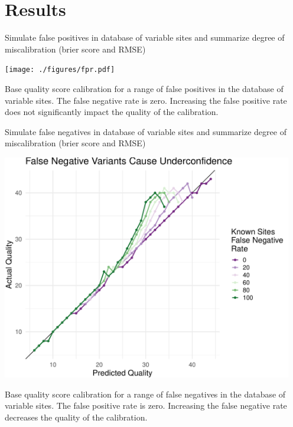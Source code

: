 \documentclass{article}
\begin{document}
\section{Results}
\begin{outline}
	\item Simulate false positives in database of variable sites and summarize degree of miscalibration (brier score and RMSE)
	\begin{outline}
		\item \texttt{[image: ./figures/fpr.pdf]}
		\item Base quality score calibration for a range of false positives in the database of variable sites. The false negative rate is zero. Increasing the false positive rate does not significantly impact the quality of the calibration.
	\end{outline}
	\item Simulate false negatives in database of variable sites and summarize degree of miscalibration (brier score and RMSE)
	\begin{outline}
		\item \includegraphics[width=5in]{./figures/fnr.pdf}
		\item Base quality score calibration for a range of false negatives in the database of variable sites. The false positive rate is zero. Increasing the false negative rate decreases the quality of the calibration.

\end{outline}
\end{outline}
\end{document}
